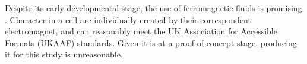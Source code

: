 Despite its early developmental stage, the use of ferromagnetic fluids is promising \cite{fletcher_magnetic_2021}.
Character in a cell are individually created by their correspondent electromagnet, and can reasonably meet the UK Association for Accessible Formats (UKAAF) standards.
Given it is at a proof-of-concept stage, producing it for this study is unreasonable.